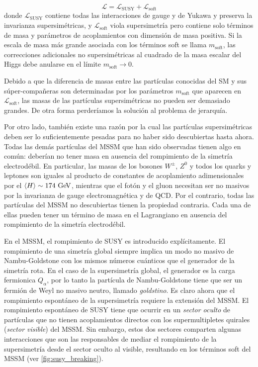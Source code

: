 \begin{equation}
  \mathcal{L} = \mathcal{L}_\text{SUSY} + \mathcal{L}_\text{soft}
\end{equation}
%
donde $\mathcal{L}_\text{SUSY}$ contiene todas las interacciones de gauge y de
Yukawa y preserva la invarianza supersimétricas, y $\mathcal{L}_\text{soft}$
viola supersimetría pero contiene solo términos de masa y parámetros de
acoplamientos con dimensión de masa positiva. Si la escala de masa más grande
asociada con los términos soft se llama $m_\text{soft}$, las correcciones
adicionales no supersimétricas al cuadrado de la masa escalar del Higgs debe
anularse en el límite $m_\text{soft} \to 0$.

Debido a que la diferencia de masas entre las partículas conocidas del SM y sus
súper-compañeras son determinadas por los parámetros $m_\text{soft}$ que
aparecen en $\mathcal{L}_\text{soft}$, las masas de las partículas
supersimétricas no pueden ser demasiado grandes. De otra forma perderíamos la
solución al problema de jerarquía.

Por otro lado, también existe una razón por la cual las partículas
supersimétricas deben ser lo suficientemente pesadas para no haber sido
descubiertas hasta ahora. Todas las demás partículas del MSSM que han sido
observadas tienen algo en común: deberían no tener masa en ausencia del
rompimiento de la simetría electrodébil. En particular, las masas de los
bosones $W^\pm$, $Z^0$ y todos los quarks y leptones son iguales al producto de
constantes de acoplamiento adimensionales por el $\avg{H} \sim 174 \gev$,
mientras que el fotón y el gluon necesitan ser no masivos por la invarianza de
gauge electromagnética y de QCD. Por el contrario, todas las partículas del MSSM
no descubiertas tienen la propiedad contraria. Cada una de ellas pueden tener un
término de masa en el Lagrangiano en ausencia del rompimiento de la simetría
electrodébil.

En el MSSM, el rompimiento de SUSY es introducido explícitamente. El rompimiento
de una simetría global siempre implica un modo no masivo de Nambu-Goldstone con
los mismos números cuánticos que el generador de la simetría rota. En el caso de
la supersimetría global, el generador es la carga fermionica $Q_\alpha$, por lo
tanto la partícula de Nambu-Goldstone tiene que ser un fermión de Weyl no masivo
neutro, llamado \emph{goldstino}. Es claro ahora que el rompimiento espontáneo
de la supersimetría requiere la extensión del MSSM. El rompimiento espontáneo de
SUSY tiene que ocurrir en un \emph{sector oculto} de partículas que no tienen
acoplamientos directos con los supermultipletes quirales (\emph{sector visible})
del MSSM. Sin embargo, estos dos sectores comparten algunas interacciones que
son las responsables de mediar el rompimiento de la supersimetría desde el
sector oculto al visible, resultando en los términos soft del MSSM (ver
\cref{fig:susy_breaking}).

